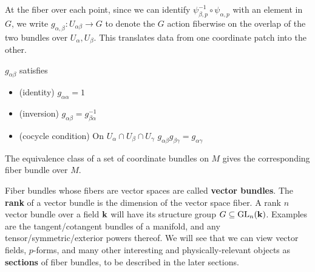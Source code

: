 		At the fiber over each point, since we can identify $\psi^{-1}_{\beta, p} \circ \psi_{\alpha, p}$ with an element in $G$, we write $g_{\alpha, \beta}: U_{\alpha \beta} \rightarrow G$ to denote the $G$ action fiberwise on the overlap of the two bundles over $U_\alpha, U_\beta$. This translates data from one coordinate patch into the other.
		\begin{prop}
			$g_{\alpha \beta}$ satisfies 
			\begin{itemize}
				\item (identity) $g_{\alpha \alpha} = 1$
				\item (inversion) $g_{\alpha \beta} = g^{-1}_{\beta \alpha}$
				\item (cocycle condition) On $U_\alpha \cap U_\beta \cap U_\gamma$ $g_{\alpha \beta} g_{\beta \gamma} = g_{\alpha \gamma}$
			\end{itemize}
			\label{prop:cocycle}
		\end{prop}
%
%
%
		The equivalence class of a set of coordinate bundles on $M$ gives the corresponding fiber bundle over $M$.
		
		Fiber bundles whose fibers are vector spaces are called \textbf{vector bundles}. The \textbf{rank} of a vector bundle is the dimension of the vector space fiber. A rank $n$ vector bundle over a field $\mathbf{k}$ will have its structure group $G \subseteq \mathrm{GL}_n(\mathbf{k})$. Examples are the tangent/cotangent bundles of a manifold, and any tensor/symmetric/exterior powers thereof. We will see that we can view vector fields, $p$-forms, and many other interesting and physically-relevant objects as \textbf{sections} of fiber bundles, to be described in the later sections.
		
